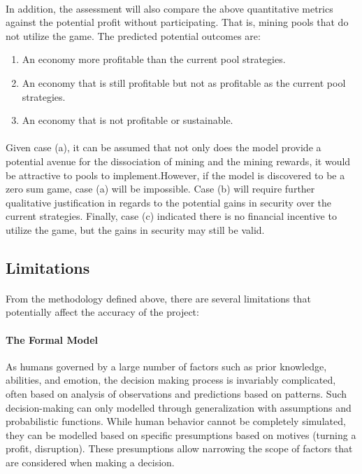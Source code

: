 \paragraph{} In addition, the assessment will also compare the above quantitative metrics against the potential profit without participating. That is, mining pools that do not utilize the game. The predicted potential outcomes are:

\renewcommand{\labelenumi}{(\alph{enumi})}
\begin{enumerate}
  \item An economy more profitable than the current pool strategies.
  \item An economy that is still profitable but not as profitable as the current pool strategies.
  \item An economy that is not profitable or sustainable.
\end{enumerate}

\paragraph{} Given case (a), it can be assumed that not only does the model provide a potential avenue for the dissociation of mining and the mining rewards, it would be attractive to pools to implement.However, if the model is discovered to be a zero sum game, case (a) will be impossible. Case (b) will require further qualitative justification in regards to the potential gains in security over the current strategies. Finally, case (c) indicated there is no financial incentive to utilize the game, but the gains in security may still be valid.

\subsection{Limitations}

\paragraph{} From the methodology defined above, there are several limitations that potentially affect the accuracy of the project:

\paragraph{The Formal Model} As humans governed by a large number of factors such as prior knowledge, abilities, and emotion, the decision making process is invariably complicated, often based on analysis of observations and predictions based on patterns. Such decision-making can only modelled through generalization with assumptions and probabilistic functions. While human behavior cannot be completely simulated, they can be modelled based on specific presumptions based on motives (turning a profit, disruption). These presumptions allow narrowing the scope of factors that are considered when making a decision.

